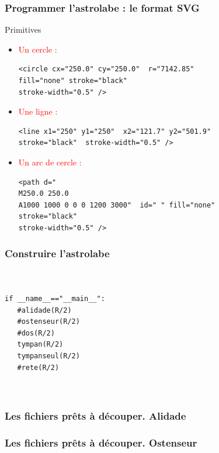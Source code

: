 \documentclass{beamer}
\begin{document}
   
   \begin{frame}[fragile]\frametitle{Programmer l'astrolabe : le format SVG}
\begin{block}{Primitives}
\begin{itemize}
\item \textcolor{red}{Un cercle :} 

\begin{verbatim}
<circle cx="250.0" cy="250.0"  r="7142.85" 
fill="none" stroke="black"  
stroke-width="0.5" />
\end{verbatim}
\item\textcolor{red}{Une ligne :}
\begin{verbatim}
<line x1="250" y1="250"  x2="121.7" y2="501.9"  
stroke="black"  stroke-width="0.5" />

\end{verbatim}
\item\textcolor{red}{Un arc de cercle :}
\begin{verbatim}
<path d="
M250.0 250.0
A1000 1000 0 0 0 1200 3000"  id=" " fill="none"  
stroke="black"   
stroke-width="0.5" />
\end{verbatim}

\end{itemize}

\end{block}
   \end{frame}

   



\begin{frame}[fragile]\frametitle{Construire l'astrolabe}

\begin{verbatim}
    

if __name__=="__main__":
   #alidade(R/2)  
   #ostenseur(R/2)
   #dos(R/2)
   tympan(R/2)
   tympanseul(R/2)
   #rete(R/2)
  
  

\end{verbatim}

   \end{frame}
   
   \begin{frame}\frametitle{Les fichiers prêts à découper.  Alidade}
\begin{center}
\end{center}
   \end{frame}
   
\begin{frame}\frametitle{Les fichiers prêts à découper.  Ostenseur}
\begin{center}
\end{center}
   \end{frame}
   
\end{document}
